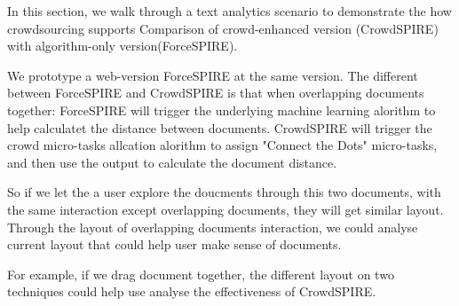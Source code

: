 \documentclass[journal]{vgtc}                %
\begin{document}
In this section, we walk through a text analytics scenario to demonstrate the how crowdsourcing supports
Comparison of crowd-enhanced version (CrowdSPIRE) with algorithm-only version(ForceSPIRE).

We prototype a web-version ForceSPIRE at the same version.
The different between ForceSPIRE and CrowdSPIRE is that when overlapping documents together:
ForceSPIRE will trigger the underlying machine learning alorithm to help calculatet the distance between documents.
CrowdSPIRE will trigger the crowd micro-tasks allcation alorithm to assign "Connect the Dots" micro-tasks, and then use the output to calculate the document distance.

So if we let the a user explore the doucments through this two documents, with the same interaction except overlapping documents, they will get similar layout.
Through the layout of overlapping documents interaction, we could analyse current layout that could help user make sense of documents.

For example, if we drag document together, the different layout on two techniques could help use analyse the effectiveness of CrowdSPIRE.
\end{document}
